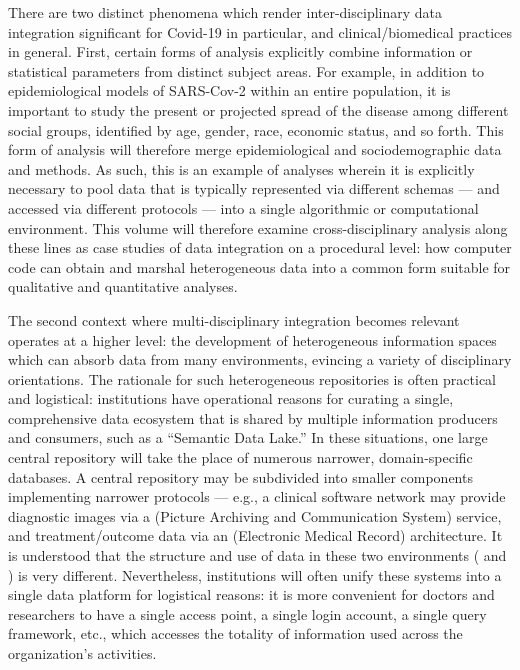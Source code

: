 \documentclass{statsoc}
\newcommand{\p}[1]{

\vspace{.75em}#1}
\newcommand{\textscc}[1]{{\color{orr!35!black}{{%
						\fontfamily{Cabin-TLF}\fontseries{b}\selectfont{\textsc{\scriptsize{#1}}}}}}}
\newcommand{\AcronymText}[1]{{\textscc{#1}}}
\newcommand{\q}[1]{{\fontfamily{qcr}\selectfont ``}#1{\fontfamily{qcr}\selectfont ''}}
\newcommand{\PACS}{\resizebox{!}{7pt}{\AcronymText{PACS}}}
\newcommand{\EMR}{\resizebox{!}{7pt}{\AcronymText{EMR}}}
\begin{document}
{\p{There are two distinct phenomena which render 
inter-disciplinary data integration significant for 
Covid-19 in particular, and clinical/biomedical practices 
in general.  First, certain forms of analysis explicitly 
combine information or statistical parameters from 
distinct subject areas.  For example, in addition 
to epidemiological models of SARS-Cov-2 within an 
entire population, it is important to study the 
present or projected spread of the disease among 
different social groups, identified by age, gender, 
race, economic status, and so forth.  This form 
of analysis will therefore merge epidemiological 
and sociodemographic data and methods.  As such, this is an 
example of analyses wherein it is explicitly necessary 
to pool data that is typically represented 
via different schemas --- and accessed via different 
protocols --- into a single algorithmic or computational 
environment.  This volume will therefore 
examine cross-disciplinary analysis along these 
lines as case studies of data integration on a procedural 
level: how computer code can obtain and marshal heterogeneous 
data into a common form suitable for 
qualitative and quantitative analyses.} 
   
\p{The second context where multi-disciplinary integration 
becomes relevant operates at a higher level: the development 
of heterogeneous information spaces which can absorb 
data from many environments, evincing a variety of 
disciplinary orientations.  The rationale for such heterogeneous 
repositories is often practical and logistical: institutions 
have operational reasons for curating a single, comprehensive data ecosystem 
that is shared by multiple information producers and consumers, such as 
a \q{Semantic Data Lake.}  In these situations, one 
large central repository will take the place of numerous 
narrower, domain-specific databases.  A central repository 
may be subdivided into smaller components implementing 
narrower protocols --- e.g., a clinical software network may provide 
diagnostic images via a \PACS{} (Picture Archiving and Communication 
System) service, and treatment/outcome data via an 
\EMR{} (Electronic Medical Record) architecture.  It is understood 
that the structure and use of data in these two environments 
(\PACS{} and \EMR{}) is very different.  Nevertheless, 
institutions will often unify these systems into 
a single data platform for logistical reasons: it 
is more convenient for doctors and researchers to 
have a single access point, a single login account, 
a single query framework, etc., which accesses the 
totality of information used across the organization's 
activities.}

}
\end{document}
